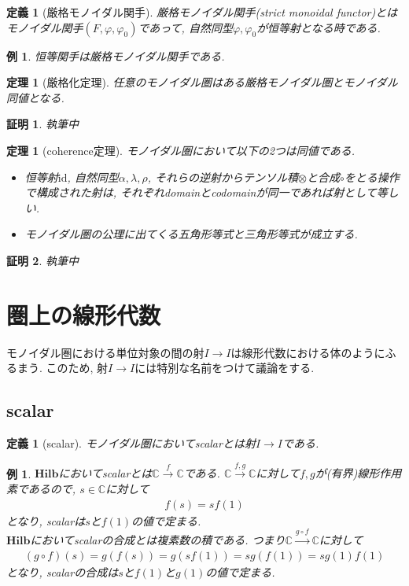 \documentclass[a4paper,12pt]{ltjsarticle}
\theoremstyle{break}
\newtheorem{defn}[thm]{定義}
\newtheorem{thrm}[thm]{定理}
\newtheorem{eg}[thm]{例}
\newtheorem*{prf}{証明}
\newcommand{\hilb}{\mathbf{Hilb}}
\newcommand{\mbc}{\mathbb{C}}
\newcommand{\xr}[1]{\xrightarrow{#1}}
\newcommand{\id}{\mathrm{id}}
\newcommand{\ci}{\circ}
\newcommand{\al}{\alpha}
\newcommand{\la}{\lambda}
\newcommand{\vp}{\varphi}
\newcommand{\ot}{\otimes}
\numberwithin{equation}{section}
\begin{document}
\begin{defn}[厳格モノイダル関手]
  厳格モノイダル関手(strict monoidal functor)とはモノイダル関手$(F,\vp,\vp_0)$であって, 自然同型$\vp,\vp_0$が恒等射となる時である. 
\end{defn}

\begin{eg}
  恒等関手は厳格モノイダル関手である. 
\end{eg}

\begin{thrm}[厳格化定理]
  任意のモノイダル圏はある厳格モノイダル圏とモノイダル同値となる.  
\end{thrm} 

\begin{prf}
  執筆中
\end{prf}

\begin{thrm}[coherence定理]
  モノイダル圏において以下の2つは同値である. 
  \begin{itemize}
    \item 恒等射$\id$, 自然同型$\al,\la,\rho$, それらの逆射からテンソル積$\ot$と合成$\circ$をとる操作で構成された射は, それぞれdomainとcodomainが同一であれば射として等しい. 
    \item モノイダル圏の公理に出てくる五角形等式と三角形等式が成立する. 
  \end{itemize}
\end{thrm}

\begin{prf}
  執筆中
\end{prf}

\newpage

\section{圏上の線形代数}

モノイダル圏における単位対象の間の射$I \to I$は線形代数における体のようにふるまう. 
このため, 射$I \to I$には特別な名前をつけて議論をする. 

\subsection{scalar}

\begin{defn}[scalar]
  モノイダル圏においてscalarとは射$I \to I$である. 
\end{defn}

\begin{eg}
  $\hilb$においてscalarとは$\mbc \xr{f} \mbc$である. 
  $\mbc \xr{f,g} \mbc$に対して$f,g$が(有界)線形作用素であるので, $s \in \mbc$に対して
  \begin{align*}
    f(s)=sf(1)
  \end{align*}
  となり, scalarは$s$と$f(1)$の値で定まる. \\
  $\hilb$においてscalarの合成とは複素数の積である. 
  つまり$\mbc \xr{g \ci f} \mbc$に対して
  \begin{align*}
    (g \ci f)(s) = g(f(s)) = g(sf(1)) = sg(f(1)) = sg(1)f(1)
  \end{align*}
  となり, scalarの合成は$s$と$f(1)$と$g(1)$の値で定まる. 
\end{eg}
\end{document}
